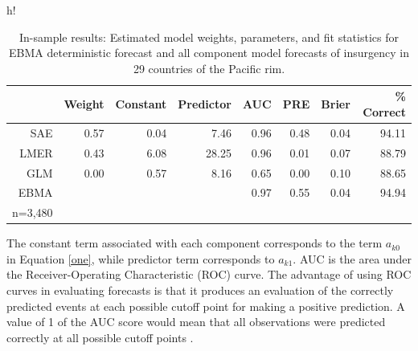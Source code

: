 \documentclass[pdftex,12pt,fullpage,oneside]{amsart}
\begin{document}
\begin{table}{h!}
\begin{center}
  \caption{\footnotesize In-sample results: Estimated model weights, parameters, and
    fit statistics for EBMA deterministic forecast and all component
    model forecasts of insurgency in 29 countries of the Pacific
    rim.}\label{InSam1}
\begin{tabular}{rrrrrrrr}
  \toprule
 & Weight & Constant & Predictor & AUC & PRE & Brier & \% Correct \\ 
  \midrule
  SAE & 0.57 & 0.04 & 7.46 & 0.96 & 0.48 & 0.04 & 94.11 \\ 
  LMER & 0.43 & 6.08 & 28.25 & 0.96 & 0.01 & 0.07 & 88.79 \\ 
  GLM & 0.00 & 0.57 & 8.16 & 0.65 & 0.00 & 0.10 & 88.65 \\ 
  EBMA &  &  &  & 0.97 & 0.55 & 0.04 & 94.94 \\ 
   \bottomrule
n=3,480\\
\end{tabular}
\end{center}
\end{table}


The constant term associated with each component corresponds to the
term $a_{k0}$ in Equation \ref{one}, while predictor term corresponds
to $a_{k1}$.  AUC is the area under the Receiver-Operating
Characteristic (ROC) curve. The advantage of using ROC curves in
evaluating forecasts is that it produces an evaluation of the
correctly predicted events at each possible cutoff point for making a
positive prediction. A value of 1 of the AUC score would mean that all
observations were predicted correctly at all possible cutoff points
\citep{King:Zeng:2001}.
\end{document}
